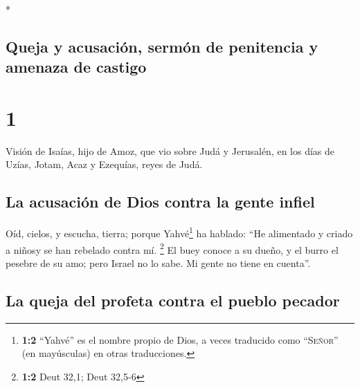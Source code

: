 \begin{paracol}{2} \switchcolumn[0]*

\hypertarget{queja-y-acusaciuxf3n-sermuxf3n-de-penitencia-y-amenaza-de-castigo}{%
\subsection{Queja y acusación, sermón de penitencia y amenaza de
castigo}\label{queja-y-acusaciuxf3n-sermuxf3n-de-penitencia-y-amenaza-de-castigo}}

\hypertarget{section}{%
\section{1}\label{section}}

 Visión de Isaías, hijo de Amoz, que vio sobre Judá y
Jerusalén, en los días de Uzías, Jotam, Acaz y Ezequías, reyes de Judá.

\hypertarget{la-acusaciuxf3n-de-dios-contra-la-gente-infiel}{%
\subsection{La acusación de Dios contra la gente
infiel}\label{la-acusaciuxf3n-de-dios-contra-la-gente-infiel}}

 Oíd, cielos, y escucha, tierra; porque Yahvé\footnote{\textbf{1:2}
  ``Yahvé'' es el nombre propio de Dios, a veces traducido como
  ``\textsc{Señor}'' (en mayúsculas) en otras traducciones.} ha hablado:
``He alimentado y criado a niñosy se han rebelado contra mí. \footnote{\textbf{1:2}
  Deut 32,1; Deut 32,5-6}  El buey conoce a su dueño, y el
burro el pesebre de su amo; pero Israel no lo sabe. Mi gente no tiene en
cuenta''.

\hypertarget{la-queja-del-profeta-contra-el-pueblo-pecador}{%
\subsection{La queja del profeta contra el pueblo
pecador}\label{la-queja-del-profeta-contra-el-pueblo-pecador}}


\end{paracol}
